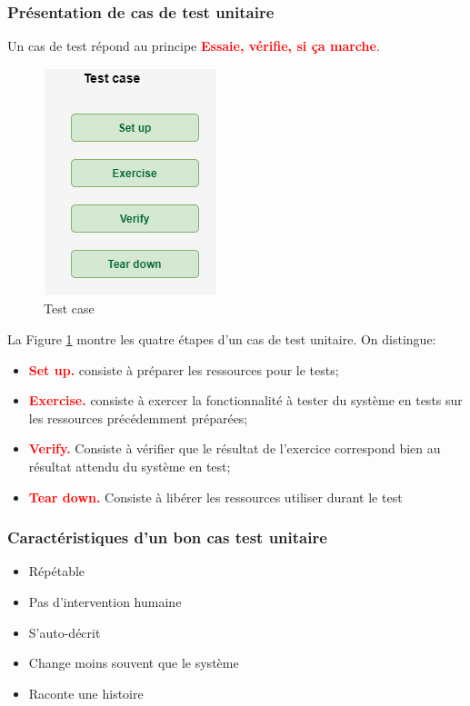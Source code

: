 \documentclass[a4paper,11pt,french]{report}
\theoremstyle{definition}
\begin{document}
\subsubsection{Présentation de cas de test unitaire}
Un cas de test  répond au principe \textbf{\textcolor{red}{Essaie, vérifie, si ça marche}}.
 \begin{figure}[!htp]
  \begin{center}
  \includegraphics[width=0.5\linewidth]{./testcase.png}
  \caption{Test case}
  \label{fig:testcase}
  \end{center}
\end{figure}
La Figure \ref{fig:testcase}   montre les quatre étapes d'un cas de test unitaire. On distingue:
\begin{itemize}
    \item \textbf{\textcolor{red}{Set up.}} consiste à  préparer les ressources pour le tests;
    \item \textbf{\textcolor{red}{Exercise.}} consiste à exercer la fonctionnalité à tester du  système en tests  sur les ressources précédemment préparées;
    \item \textbf{\textcolor{red}{Verify.}} Consiste à vérifier que le résultat de l'exercice correspond bien au résultat attendu du système en test;
    \item \textbf{\textcolor{red}{Tear down.}} Consiste à libérer les ressources utiliser durant le test
\end{itemize}

\subsubsection{Caractéristiques d'un bon cas test unitaire}
\begin{itemize}
    \item Répétable
\item Pas d'intervention humaine
\item S'auto-décrit
\item Change moins souvent que le système
\item Raconte une histoire
\end{itemize}
\end{document}
